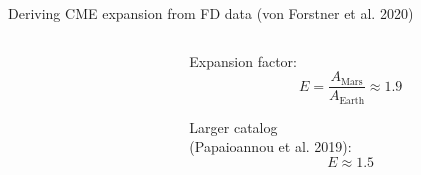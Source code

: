 \documentclass[10pt,aspectratio=169,usenames,dvipsnames]{beamer}
\newcommand{\summary}{\textcolor{mOrange}{\faArrowCircleRight}\;}
\begin{document}
\begin{frame}{Deriving CME expansion from FD data (von Forstner et al. 2020)}
    \begin{columns}
        \begin{column}{0.6\textwidth}
            \centering
            \scalebox{0.85}{}
        \end{column}
        \begin{column}{0.35\textwidth}            
            \summary Expansion factor:
            \[E = \frac{A_\text{Mars}}{A_\text{Earth}} \approx 1.9\]
            
            Larger catalog\\(Papaioannou et al. 2019): \[E \approx 1.5\]
        \end{column}
    \end{columns}
\end{frame}
\end{document}
